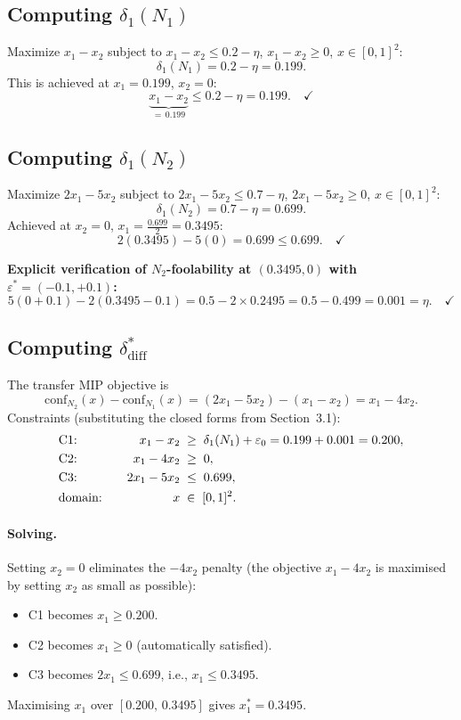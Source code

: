 \documentclass[12pt]{article}
\theoremstyle{definition}
\theoremstyle{plain}
\theoremstyle{remark}
\newcommand{\conf}[2]{\mathrm{conf}_{#1}(#2)}
\newcommand{\dN}[1]{\delta_1(N_{#1})}
\newcommand{\ddiff}{\delta_{\mathrm{diff}}^{*}}
\begin{document}
\subsection{Computing $\dN{1}$}

Maximize $x_1-x_2$ subject to $x_1-x_2\leq 0.2-\eta$,
$x_1-x_2\geq 0$, $x\in[0,1]^2$:
\[
  \dN{1} = 0.2-\eta = 0.199.
\]
This is achieved at $x_1=0.199$, $x_2=0$:
\[
  \underbrace{x_1-x_2}_{=\,0.199}
  \leq 0.2-\eta=0.199. \quad\checkmark
\]

\subsection{Computing $\dN{2}$}

Maximize $2x_1-5x_2$ subject to $2x_1-5x_2\leq 0.7-\eta$,
$2x_1-5x_2\geq 0$, $x\in[0,1]^2$:
\[
  \dN{2} = 0.7-\eta = 0.699.
\]
Achieved at $x_2=0$, $x_1=\frac{0.699}{2}=0.3495$:
\[
  2(0.3495)-5(0) = 0.699 \leq 0.699.\quad\checkmark
\]

\noindent
\textbf{Explicit verification of $N_2$-foolability at $(0.3495,0)$
with $\varepsilon^*=(-0.1,+0.1)$:}
\[
  5(0+0.1)-2(0.3495-0.1)
  = 0.5 - 2\times 0.2495
  = 0.5 - 0.499
  = 0.001
  = \eta.
  \quad\checkmark
\]

\subsection{Computing $\ddiff$}

The transfer MIP objective is
\[
  \conf{N_2}{x}-\conf{N_1}{x}
  =(2x_1-5x_2)-(x_1-x_2)
  = x_1 - 4x_2.
\]
Constraints (substituting the closed forms from Section~3.1):
\begin{alignat}{2}
  &\text{C1:} & \quad x_1-x_2 &\;\geq\; \dN{1}+\varepsilon_0
    = 0.199+0.001 = 0.200, \label{eq:C1}\\
  &\text{C2:} & \quad x_1-4x_2 &\;\geq\; 0, \label{eq:C2}\\
  &\text{C3:} & \quad 2x_1-5x_2 &\;\leq\; 0.699, \label{eq:C3}\\
  &\text{domain:} & \quad x &\;\in\; [0,1]^2. \notag
\end{alignat}

\paragraph{Solving.}
Setting $x_2=0$ eliminates the $-4x_2$ penalty (the objective $x_1-4x_2$ is
maximised by setting $x_2$ as small as possible):
\begin{itemize}
  \item C1 becomes $x_1\geq 0.200$.
  \item C2 becomes $x_1\geq 0$ (automatically satisfied).
  \item C3 becomes $2x_1\leq 0.699$, i.e., $x_1\leq 0.3495$.
\end{itemize}
Maximising $x_1$ over $[0.200,\,0.3495]$ gives $x_1^*=0.3495$.
\end{document}
